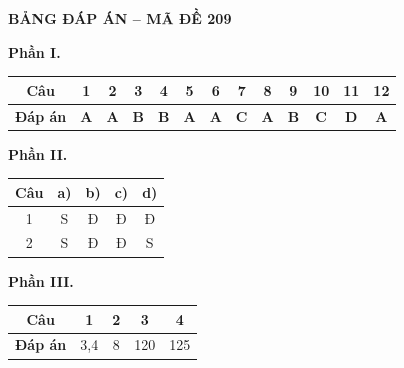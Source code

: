 
\vspace{0.3cm}
\noindent\begin{minipage}{\linewidth}
\begin{center}{\large\bfseries\color{red!80!black} BẢNG ĐÁP ÁN -- MÃ ĐỀ 209}\end{center}
\noindent\textbf{Phần I.}\par\smallskip
\begin{center}\begin{tabular}{|c|c|c|c|c|c|c|c|c|c|c|c|c|}\hline
\textbf{Câu} & 1 & 2 & 3 & 4 & 5 & 6 & 7 & 8 & 9 & 10 & 11 & 12 \\ \hline
\textbf{Đáp án} & \textbf{A} & \textbf{A} & \textbf{B} & \textbf{B} & \textbf{A} & \textbf{A} & \textbf{C} & \textbf{A} & \textbf{B} & \textbf{C} & \textbf{D} & \textbf{A} \\ \hline
\end{tabular}\end{center}
\noindent\textbf{Phần II.}\par\smallskip
\begin{center}\begin{tabular}{|c|c|c|c|c|}\hline
\textbf{Câu} & \textbf{a)} & \textbf{b)} & \textbf{c)} & \textbf{d)} \\ \hline
1 & S & Đ & Đ & Đ \\ \hline
2 & S & Đ & Đ & S \\ \hline
\end{tabular}\end{center}
\noindent\textbf{Phần III.}\par\smallskip
\begin{center}\begin{tabular}{|c|c|c|c|c|}\hline
\textbf{Câu} & 1 & 2 & 3 & 4 \\ \hline
\textbf{Đáp án} & 3,4 & 8 & 120 & 125 \\ \hline
\end{tabular}\end{center}
\end{minipage}

